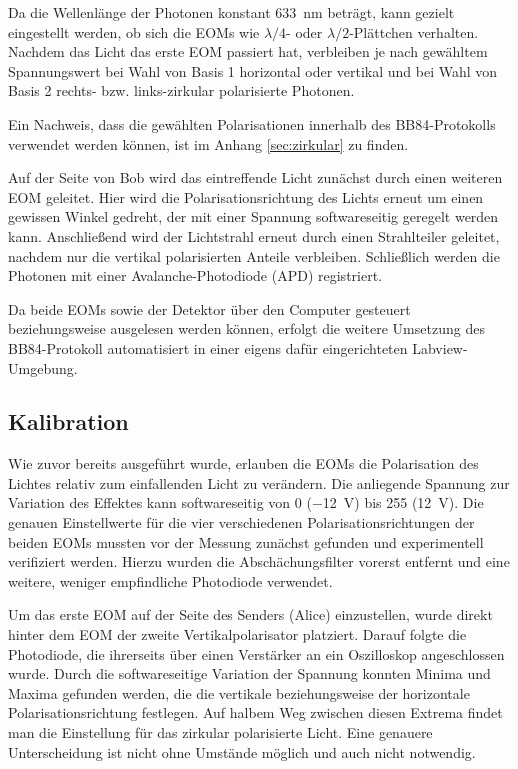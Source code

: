 Da die Wellenlänge der Photonen konstant \SI{633}{nm} beträgt, kann gezielt
eingestellt werden, ob sich die EOMs wie $λ/4$- oder $λ/2$-Plättchen verhalten.
Nachdem das Licht das erste EOM passiert hat, verbleiben je nach gewähltem
Spannungswert bei Wahl von Basis 1 horizontal oder vertikal und bei Wahl von
Basis 2 rechts- bzw. links-zirkular polarisierte Photonen.

Ein Nachweis, dass die gewählten Polarisationen innerhalb des BB84-Protokolls
verwendet werden können, ist im Anhang \ref{sec:zirkular} zu finden.

Auf der Seite von Bob wird das eintreffende Licht zunächst durch einen weiteren
EOM geleitet. Hier wird die Polarisationsrichtung des Lichts erneut um einen
gewissen Winkel gedreht, der mit einer Spannung softwareseitig geregelt werden
kann. Anschließend wird der Lichtstrahl erneut durch einen Strahlteiler
geleitet, nachdem nur die vertikal polarisierten Anteile verbleiben.
Schließlich werden die Photonen mit einer Avalanche-Photodiode (APD)
registriert.

Da beide EOMs sowie der Detektor über den Computer gesteuert beziehungsweise
ausgelesen werden können, erfolgt die weitere Umsetzung des BB84-Protokoll
automatisiert in einer eigens dafür eingerichteten Labview-Umgebung.

\subsection{Kalibration}

Wie zuvor bereits ausgeführt wurde, erlauben die EOMs die Polarisation des
Lichtes relativ zum einfallenden Licht zu verändern. Die anliegende Spannung
zur Variation des Effektes kann softwareseitig von 0 (\SI{-12}{\volt}) bis
255 (\SI{+12}{\volt}). Die genauen Einstellwerte für die vier verschiedenen
Polarisationsrichtungen der beiden EOMs mussten vor der Messung zunächst
gefunden und experimentell verifiziert werden. Hierzu wurden die
Abschächungsfilter vorerst entfernt und eine weitere, weniger empfindliche
Photodiode verwendet.

Um das erste EOM auf der Seite des Senders (Alice) einzustellen, wurde direkt
hinter dem EOM der zweite Vertikalpolarisator platziert. Darauf folgte die
Photodiode, die ihrerseits über einen Verstärker an ein Oszilloskop
angeschlossen wurde. Durch die softwareseitige Variation der Spannung konnten
Minima und Maxima gefunden werden, die die vertikale beziehungsweise der
horizontale Polarisationsrichtung festlegen. Auf halbem Weg zwischen diesen
Extrema findet man die Einstellung für das zirkular polarisierte Licht. Eine
genauere Unterscheidung ist nicht ohne Umstände möglich und auch nicht notwendig.

